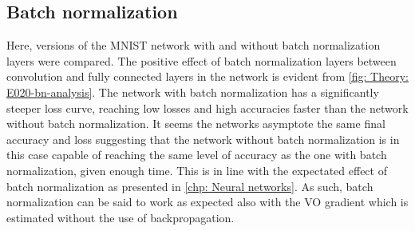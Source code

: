 \subsection{Batch normalization}\label{sec: Experimental work: Batch normalization}
Here, versions of the \gls{MNIST} network with and without batch normalization layers were compared. The positive effect of batch normalization layers between convolution and fully connected layers in the network is evident from \autoref{fig: Theory: E020-bn-analysis}. The network with batch normalization has a significantly steeper loss curve, reaching low losses and high accuracies faster than the network without batch normalization.
It seems the networks asymptote the same final accuracy and loss suggesting that the network without batch normalization is in this case capable of reaching the same level of accuracy as the one with batch normalization, given enough time.
This is in line with the expectated effect of batch normalization as presented in \autoref{chp: Neural networks}. As such, batch normalization can be said to work as expected also with the \gls{VO} gradient which is estimated without the use of backpropagation.




